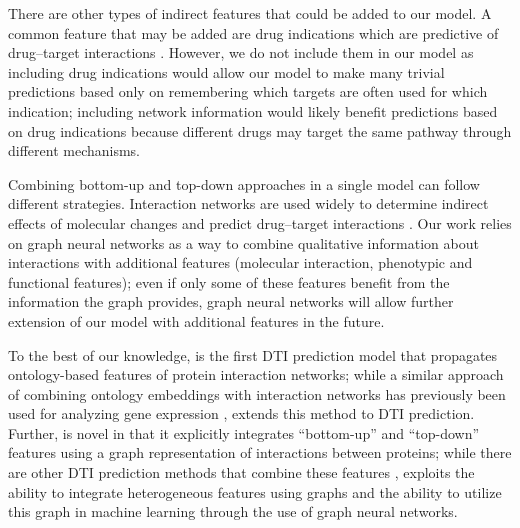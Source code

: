 \documentclass{bioinfo}
\renewcommand{\cite}{\citep}
\begin{document}
There are other types of indirect features that could be added to our
model. A common feature that may be added are drug indications which
are predictive of drug--target interactions \cite{Gottlieb2011}.
However, we do not include them in our model as including drug
indications would allow our model to make many trivial predictions
based only on remembering which targets are often used for which
indication; including network information would likely benefit
predictions based on drug indications because different drugs may
target the same pathway through different mechanisms.

Combining bottom-up and top-down approaches in a single model can
follow different strategies. Interaction networks are used widely to
determine indirect effects of molecular changes and predict
drug--target interactions \cite{LotfiShahreza2017}. Our work relies on
graph neural networks as a way to combine qualitative information
about interactions with additional features (molecular interaction,
phenotypic and functional features); even if only some of these
features benefit from the information the graph provides, graph neural
networks will allow further extension of our model with additional
features in the future.

To the best of our knowledge, \name{} is the first DTI prediction
model that propagates ontology-based features of protein interaction
networks; while a similar approach of combining ontology embeddings
with interaction networks has previously been used for analyzing gene
expression \cite{Trebacz2020}, \name{} extends this method to DTI
prediction. Further, \name{} is novel in that it explicitly integrates
``bottom-up'' and ``top-down'' features using a graph representation
of interactions between proteins; while there are other DTI prediction
methods that combine these features \cite{Gottlieb2011}, \name{}
exploits the ability to integrate heterogeneous features using graphs
and the ability to utilize this graph in machine learning through the
use of graph neural networks.




\end{document}

